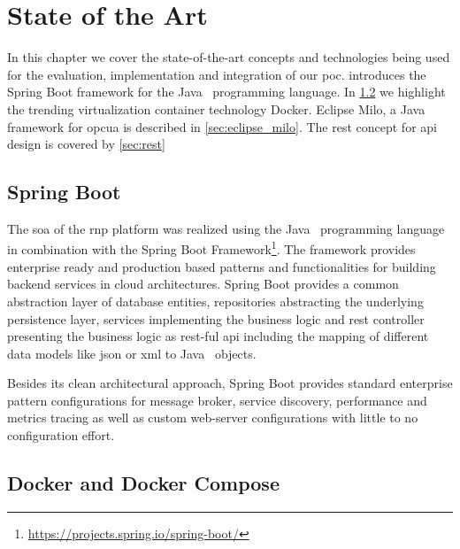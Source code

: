 \documentclass[
a4paper,
twoside,
headsepline,
cleardoublepage=empty,
parskip=half,
draft=false
]{scrbook}
\begin{document}
	\chapter{State of the Art}\label{ch:state_of_the_art}
	
		In this chapter we cover the state-of-the-art concepts and technologies being used for the evaluation, implementation and integration of our \gls{poc}.  introduces the Spring Boot framework for the Java~\cite{java2015} programming language. In \cref{sec:docker} we highlight the trending virtualization container technology Docker. Eclipse Milo, a Java~\cite{java2015} framework for \gls{opcua} is described in \cref{sec:eclipse_milo}. The \gls{rest} concept for \gls{api} design is covered by \cref{sec:rest}

		\section{Spring Boot}\label{sec:spring_boot}

			The \gls{soa} of the \gls{rnp} platform was realized using the Java~\cite{java2015} programming language in combination with the Spring Boot Framework\footnote{\url{https://projects.spring.io/spring-boot/}}. The framework provides enterprise ready and production based patterns and functionalities for building backend services in cloud architectures. Spring Boot provides a common abstraction layer of database entities, repositories abstracting the underlying persistence layer, services implementing the business logic and \gls{rest} controller presenting the business logic as \gls{rest}-ful \gls{api} including the mapping of different data models like \gls{json} or \gls{xml} to Java~\cite{java2015} objects.
			
			Besides its clean architectural approach, Spring Boot provides standard enterprise pattern configurations for message broker, service discovery, performance and metrics tracing as well as custom web-server configurations with little to no configuration effort.

		\section{Docker and Docker Compose}\label{sec:docker}
		
\end{document}

